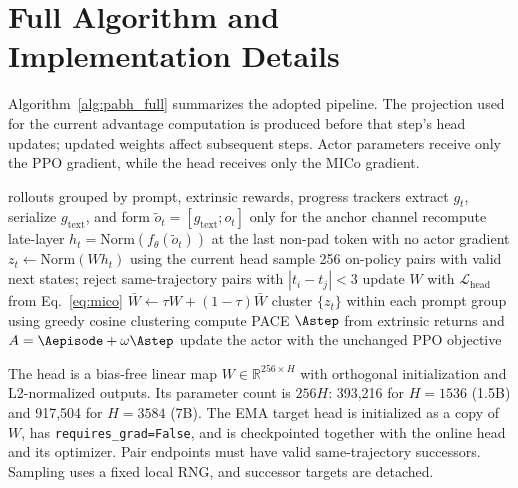 
\section{Full Algorithm and Implementation Details}
\label{app:algorithm}

Algorithm~\ref{alg:pabh_full} summarizes the adopted pipeline. The projection used for the current advantage computation is produced before that step's head updates; updated weights affect subsequent steps. Actor parameters receive only the PPO gradient, while the head receives only the MICo gradient.

\begin{algorithm}[h]
\caption{PABH advantage computation and head update}
\label{alg:pabh_full}
\begin{algorithmic}[1]
\Require rollouts grouped by prompt, extrinsic rewards, progress trackers
  \State extract $g_t$, serialize $g_{\mathrm{text}}$, and form $\tilde o_t=[g_{\mathrm{text}};o_t]$ only for the anchor channel
  \State recompute late-layer $h_t=\mathrm{Norm}(f_\theta(\tilde o_t))$ at the last non-pad token with no actor gradient
  \State $z_t\leftarrow\mathrm{Norm}(Wh_t)$ using the current head
    \State sample 256 on-policy pairs with valid next states; reject same-trajectory pairs with $|t_i-t_j|<3$
      \State update $W$ with $\mathcal L_{\mathrm{head}}$ from Eq.~\ref{eq:mico}
      \State $\bar W\leftarrow\tau W+(1-\tau)\bar W$ 
    \EndFor
  \EndFor
  \State cluster $\{z_t\}$ within each prompt group using greedy cosine clustering
  \State compute PACE $\Astep$ from extrinsic returns and $A=\Aepisode+\omega\Astep$
  \State update the actor with the unchanged PPO objective
\EndFor
\end{algorithmic}
\end{algorithm}

The head is a bias-free linear map $W\in\mathbb R^{256\times H}$ with orthogonal initialization and L2-normalized outputs. Its parameter count is $256H$: 393,216 for $H=1536$ (1.5B) and 917,504 for $H=3584$ (7B). The EMA target head is initialized as a copy of $W$, has \texttt{requires\_grad=False}, and is checkpointed together with the online head and its optimizer. Pair endpoints must have valid same-trajectory successors. Sampling uses a fixed local RNG, and successor targets are detached.

